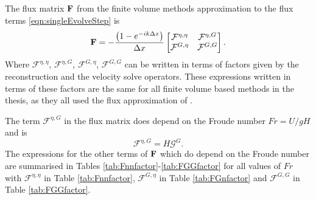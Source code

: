 The flux matrix $\mathbf{F}$ from the finite volume methods approximation to the flux terms \eqref{eqn:singleEvolveStep} is
\begin{equation}
 \mathbf{F} = - \dfrac{\left(1 - e^{-ik\Delta x}\right)}{ \Delta x}\begin{bmatrix}
 \mathcal{F}^{\eta,\eta} & \mathcal{F}^{\eta,G} \\\mathcal{F}^{G,\eta} &\mathcal{F}^{G,G}
 \end{bmatrix}.
 \label{eqn:APPFlux}
\end{equation}
Where $\mathcal{F}^{\eta,\eta} $, $\mathcal{F}^{\eta,G} $, $\mathcal{F}^{G,\eta} $, $\mathcal{F}^{G,G} $ can be written in terms of factors given by the reconstruction and the velocity solve operators. These expressions written in terms of these factors are the same for all finite volume based methods in the thesis, as they all used the flux approximation of \citet{Kurganov-etal-2001-707}.

The term $\mathcal{F}^{\eta,G}$ in the flux matrix does depend on the Froude number $Fr = U/ gH$ and is
\[\mathcal{F}^{\eta,G} = H \mathcal{G}^G. \]
The expressions for the other terms of $\mathbf{F}$ which do depend on the Froude number are summarised in Tables \ref{tab:Fnnfactor}-\ref{tab:FGGfactor} for all values of $Fr$ with $\mathcal{F}^{\eta,\eta}$ in Table \ref{tab:Fnnfactor}, $\mathcal{F}^{G,\eta}$ in Table \ref{tab:FGnfactor} and $\mathcal{F}^{G,G}$ in Table \ref{tab:FGGfactor}.




